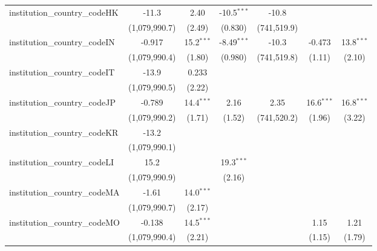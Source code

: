 \begin{tabular}{lcccccc}
   institution\_country\_codeHK          & -11.3         & 2.40          & -10.5$^{***}$ & -10.8         &               &   \\   
                                         & (1,079,990.7) & (2.49)        & (0.830)       & (741,519.9)   &               &   \\   
   institution\_country\_codeIN          & -0.917        & 15.2$^{***}$  & -8.49$^{***}$ & -10.3         & -0.473        & 13.8$^{***}$\\   
                                         & (1,079,990.4) & (1.80)        & (0.980)       & (741,519.8)   & (1.11)        & (2.10)\\   
   institution\_country\_codeIT          & -13.9         & 0.233         &               &               &               &   \\   
                                         & (1,079,990.5) & (2.22)        &               &               &               &   \\   
   institution\_country\_codeJP          & -0.789        & 14.4$^{***}$  & 2.16          & 2.35          & 16.6$^{***}$  & 16.8$^{***}$\\   
                                         & (1,079,990.2) & (1.71)        & (1.52)        & (741,520.2)   & (1.96)        & (3.22)\\   
   institution\_country\_codeKR          & -13.2         &               &               &               &               &   \\   
                                         & (1,079,990.1) &               &               &               &               &   \\   
   institution\_country\_codeLI          & 15.2          &               & 19.3$^{***}$  &               &               &   \\   
                                         & (1,079,990.9) &               & (2.16)        &               &               &   \\   
   institution\_country\_codeMA          & -1.61         & 14.0$^{***}$  &               &               &               &   \\   
                                         & (1,079,990.7) & (2.17)        &               &               &               &   \\   
   institution\_country\_codeMO          & -0.138        & 14.5$^{***}$  &               &               & 1.15          & 1.21\\   
                                         & (1,079,990.4) & (2.21)        &               &               & (1.15)        & (1.79)\\   

\end{tabular}
